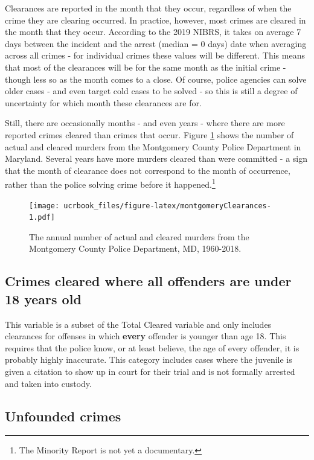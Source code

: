 \documentclass[
  12pt,
  openany]{book}
\begin{document}
Clearances are reported in the month that they occur, regardless of when the crime they are clearing occurred. In practice, however, most crimes are cleared in the month that they occur. According to the 2019 NIBRS, it takes on average 7 days between the incident and the arrest (median = 0 days) date when averaging across all crimes - for individual crimes these values will be different. This means that most of the clearances will be for the same month as the initial crime - though less so as the month comes to a close. Of course, police agencies can solve older cases - and even target cold cases to be solved - so this is still a degree of uncertainty for which month these clearances are for.

Still, there are occasionally months - and even years - where there are more reported crimes cleared than crimes that occur. Figure \ref{fig:montgomeryClearances} shows the number of actual and cleared murders from the Montgomery County Police Department in Maryland. Several years have more murders cleared than were committed - a sign that the month of clearance does not correspond to the month of occurrence, rather than the police solving crime before it happened.\footnote{The Minority Report is not yet a documentary.}

\begin{figure}
\centering
\texttt{[image: ucrbook\_files/figure-latex/montgomeryClearances-1.pdf]}
\caption{\label{fig:montgomeryClearances}The annual number of actual and cleared murders from the Montgomery County Police Department, MD, 1960-2018.}
\end{figure}

\hypertarget{crimes-cleared-where-all-offenders-are-under-18-years-old}{%
\subsection{Crimes cleared where all offenders are under 18 years old}\label{crimes-cleared-where-all-offenders-are-under-18-years-old}}

This variable is a subset of the Total Cleared variable and only includes clearances for offenses in which \textbf{every} offender is younger than age 18. This requires that the police know, or at least believe, the age of every offender, it is probably highly inaccurate. This category includes cases where the juvenile is given a citation to show up in court for their trial and is not formally arrested and taken into custody.

\hypertarget{unfounded-crimes}{%
\subsection{Unfounded crimes}\label{unfounded-crimes}}
\end{document}
